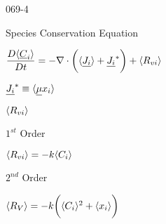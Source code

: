 \begin{mitframe}{069-4}
\begin{listone}
\begin{listtwo}
\begin{listthree}
               \end{listthree}

				\end{listtwo}

\item Species Conservation Equation

					\begin{listtwo}
                                     
                    \item $\dfrac{\elecdisplace\langle\uline{\conc}_{\state}\rangle}{\elecdisplace{t}}=-\nabla\cdot\bigg(\langle\uline{\molspecflux}\rangle+\uline{\molspecflux}^*\bigg)+\langle\gasconst_{\vvel\state}\rangle$
                    
               
                    \item$\uline{\molspecflux}^*\equiv\langle\uline{\chempot}\specfrac{i}\rangle$
                    \item $\langle\gasconst_{\vvel\state}\rangle$
                    
                    			\begin{listfour}
                                \item $1^{st}$ Order
                                				\begin{listfive}
                                               \item $\langle\gasconst_{\vvel\state}\rangle=-\thermcond\langle\conc_{\state}\rangle$
                                               \end{listfive}
                                      \item $2^{nd}$ Order

												\begin{listfive}
                                               \item $\langle\specsource\rangle=-\thermcond\bigg(\langle\conc_{\state}\rangle^2+\langle\specfrac{i}\rangle\bigg)$
                                                
												\end{listfive}
\end{listfour}
\end{listtwo}
\end{listone}

\end{mitframe}